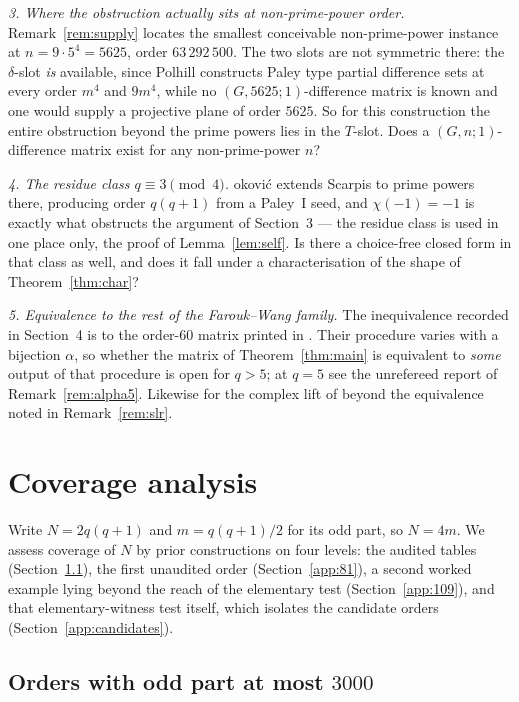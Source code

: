 \documentclass[11pt]{article}
\begin{document}
\emph{3.  Where the obstruction actually sits at non-prime-power order.}
Remark~\ref{rem:supply} locates the smallest conceivable non-prime-power
instance at \(n=9\cdot5^{4}=5625\), order \(63\,292\,500\).  The two slots are
not symmetric there: the \(\delta\)-slot \emph{is} available, since Polhill
\cite{Polhill2010} constructs Paley type partial difference sets at every
order \(m^{4}\) and \(9m^{4}\), while no \((G,5625;1)\)-difference matrix is
known and one would supply a projective plane of order \(5625\).  So for this
construction the entire obstruction beyond the prime powers lies in the
\(T\)-slot.  Does a \((G,n;1)\)-difference matrix exist for any
non-prime-power \(n\)?

\emph{4.  The residue class \(q\equiv3\pmod4\).}  \DJ okovi\'c
\cite{Djokovic2016} extends Scarpis to prime powers there, producing order
\(q(q+1)\) from a Paley~I seed, and \(\chi(-1)=-1\) is exactly what obstructs
the argument of Section~3 --- the residue class is used in one place only, the
proof of Lemma~\ref{lem:self}.  Is
there a choice-free closed form in that class as well, and does it fall under
a characterisation of the shape of Theorem~\ref{thm:char}?

\emph{5.  Equivalence to the rest of the Farouk--Wang family.}  The
inequivalence recorded in Section~4 is to the order-\(60\) matrix printed in
\cite{FaroukWang2020}.  Their procedure varies with a bijection \(\alpha\),
so whether the matrix of Theorem~\ref{thm:main} is equivalent to
\emph{some} output of that procedure is open for \(q>5\); at \(q=5\) see the
unrefereed report of Remark~\ref{rem:alpha5}.  Likewise for the complex lift
of \cite{SargentLeeRushall2024} beyond the equivalence noted in
Remark~\ref{rem:slr}.

\appendix

\section{Coverage analysis}\label{app:coverage}

Write \(N=2q(q+1)\) and \(m=q(q+1)/2\) for its odd part, so
\(N=4m\).  We assess coverage of \(N\) by prior constructions on four
levels: the audited tables (Section~\ref{app:audit}), the first unaudited
order (Section~\ref{app:81}), a second worked example lying beyond the reach
of the elementary test (Section~\ref{app:109}), and that elementary-witness
test itself, which isolates the candidate orders
(Section~\ref{app:candidates}).

\subsection{Orders with odd part at most \texorpdfstring{\(3000\)}{3000}}
\label{app:audit}
\end{document}
